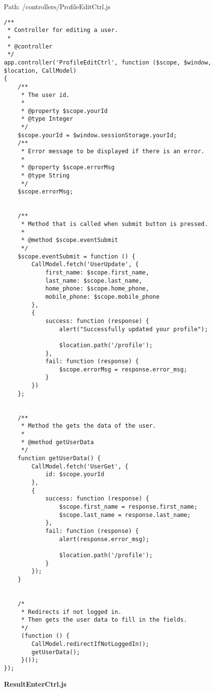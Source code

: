 Path: /controllers/ProfileEditCtrl.js
{\scriptsize
\begin{lstlisting}
/**
 * Controller for editing a user.
 *
 * @controller
 */
app.controller('ProfileEditCtrl', function ($scope, $window, $location, CallModel)
{
	/**
	 * The user id.
	 *
	 * @property $scope.yourId
	 * @type Integer
	 */
	$scope.yourId = $window.sessionStorage.yourId;
	/**
	 * Error message to be displayed if there is an error.
	 *
	 * @property $scope.errorMsg
	 * @type String
	 */
	$scope.errorMsg;


	/**
	 * Method that is called when submit button is pressed.
	 *
	 * @method $scope.eventSubmit
	 */
	$scope.eventSubmit = function () {
		CallModel.fetch('UserUpdate', {
			first_name: $scope.first_name,
			last_name: $scope.last_name,
			home_phone: $scope.home_phone,
			mobile_phone: $scope.mobile_phone
		},
		{
			success: function (response) {
				alert("Successfully updated your profile");

				$location.path('/profile');
			},
			fail: function (response) {
				$scope.errorMsg = response.error_msg;
			}
		})
	};


	/**
	 * Method the gets the data of the user.
	 *
	 * @method getUserData
	 */
	function getUserData() {
		CallModel.fetch('UserGet', {
			id: $scope.yourId
		},
		{
			success: function (response) {
				$scope.first_name = response.first_name;
				$scope.last_name = response.last_name;
			},
			fail: function (response) {
				alert(response.error_msg);

				$location.path('/profile');
			}
		});
	}


	/*
	 * Redirects if not logged in.
	 * Then gets the user data to fill in the fields.
	 */
	 (function () {
	 	CallModel.redirectIfNotLoggedIn();
	 	getUserData();
	 }());
});\end{lstlisting}
}
\textbf{ResultEnterCtrl.js}

